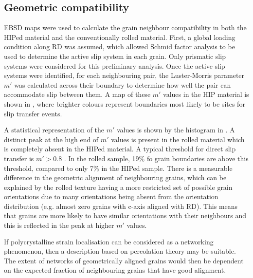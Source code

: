 \subsection{Geometric compatibility}
EBSD maps were used to calculate the grain neighbour compatibility in both the HIPed material and the conventionally rolled material.
First, a global loading condition along RD was assumed, which allowed Schmid factor analysis to be used to determine the active slip system in each grain.
Only prismatic slip systems were considered for this preliminary analysis.
Once the active slip systems were identified, for each neighbouring pair, the Luster-Morris parameter $m'$ was calculated across their boundary to determine how well the pair can accommodate slip between them.
A map of these $m'$ values in the HIP material is shown in , where brighter colours represent boundaries most likely to be sites for slip transfer events.

A statistical representation of the $m'$ values is shown by the histogram in .
A distinct peak at the high end of $m'$ values is present in the rolled material which is completely absent in the HIPed material.
A typical threshold for direct slip transfer is $m' > 0.8$ \cite{nieto-valeirasAnalysisSlipTransfer2024}.
In the rolled sample, 19\% fo grain boundaries are above this threshold, compared to only 7\% in the HIPed sample.
There is a measurable difference in the geometric alignment of neighbouring grains, which can be explained by the rolled texture having a more restricted set of possible grain orientations due to many orientations being absent from the orientation distribution (e.g. almost zero grains with c-axis aligned with RD).
This means that grains are more likely to have similar orientations with their neighbours and this is reflected in the peak at higher $m'$ values.

If polycrystalline strain localisation can be considered as a networking phenomenon, then a description based on percolation theory may be suitable.
The extent of networks of geometrically aligned grains would then be dependent on the expected fraction of neighbouring grains that have good alignment.


